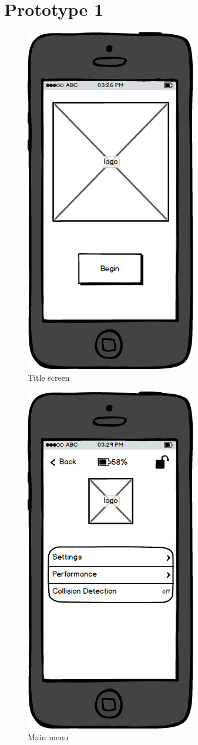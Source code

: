 \documentclass[a4paper]{report}
\begin{document}
\chapter{Prototype 1}
\begin{figure}
\centering
\includegraphics[scale=0.]{figures/prototype_1/title}
\caption{Title screen}
\end{figure}
\clearpage
\begin{figure}
\centering
\includegraphics[scale=0.9]{figures/prototype_1/main_menu}
\caption{Main menu}
\end{figure}
\end{document}
